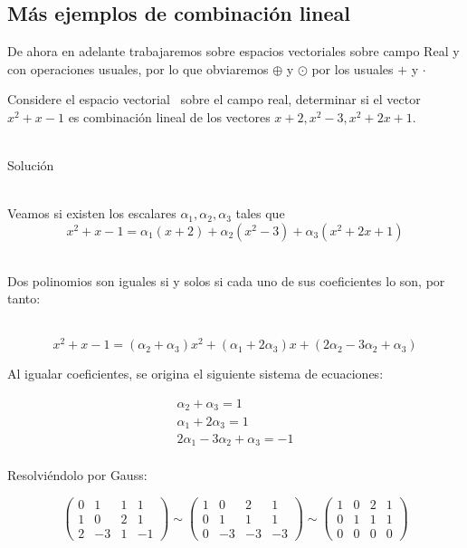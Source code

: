 \subsection{M\'as ejemplos de combinaci\'on lineal}

De ahora en adelante trabajaremos sobre espacios vectoriales sobre campo Real y con operaciones usuales, por lo que obviaremos $\oplus$ y $\odot$ por los usuales $+$ y $\cdot$

\begin{ejemplo}
Considere el espacio vectorial \pdos\ sobre el campo real, determinar si el vector $x^2+x-1$ es combinación lineal de los vectores $x+2, x^2-3, x^2+2x+1$.
\end{ejemplo}
~\\
Soluci\'on

~\\
Veamos si existen los escalares $\alpha_1, \alpha_2, \alpha_3$ tales que
\[x^2+x-1=\alpha_1\left(x+2\right)+
\alpha_2\left(x^2-3\right)+
\alpha_3\left(x^2+2x+1\right)
\]

~\\
Dos polinomios son iguales si y solos si cada uno de sus coeficientes lo son, por tanto:

~\\
\[x^2+x-1=\left(\alpha_2+\alpha_3\right)x^2+
\left(\alpha_1+2\alpha_3\right)x+
\left(2\alpha_2-3\alpha_2+\alpha_3\right)
\]

Al igualar coeficientes, se origina el siguiente sistema de ecuaciones:

\begin{eqnarray*}
\alpha_2+\alpha_3=1\\
\alpha_1+2\alpha_3=1\\
2\alpha_1-3\alpha_2+\alpha_3=-1\\
\end{eqnarray*}

Resolvi\'endolo por Gauss:

\[
\left(
\begin{array}{rrr|r}
0 &1 &1 &1\\
1&0&2&1\\
2 &-3&1&-1
\end{array}
\right)
\sim
\left(
\begin{array}{rrr|r}
1 &0 &2 &1\\
0&1&1&1\\
0 &-3&-3&-3
\end{array}
\right)
\sim
\left(
\begin{array}{rrr|r}
1 &0 &2 &1\\
0&1&1&1\\
0 &0&0&0
\end{array}
\right)\]

